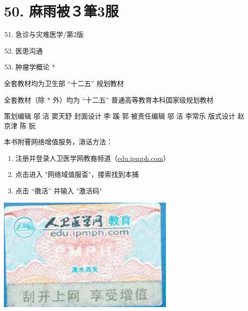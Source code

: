 \documentclass[10pt]{article}
\begin{document}
\section*{50. 麻雨被３筆3服}
\begin{enumerate}
  \setcounter{enumi}{50}
  \item 急诊与灾难医学/第2版

  \item 医患沟通

  \item 肿瘤学概论 *

\end{enumerate}

全套教材均为卫生部 “十二五” 规划教材

全套教材（除 * 外）均为 “十二五” 普通高等教育本科国家级规划教材

策划编辑 邬 洁 窦天舒 封面设计 李 蹊 郭 被责任编辑 邬 洁 李常乐 版式设计 赵京津 陈 朊

本书附罾网络增值服务，潡话方法：

\begin{enumerate}
  \item 注册并登录人卫医学网教裔频道（\href{http://edu.ipmph.com}{edu.ipmph.com}）

  \item 点击进入 "网络域值服㫘"，搂索找到本捕

  \item 点击 “擞活” 并输入 "激活码"

\end{enumerate}

\begin{center}
\includegraphics[max width=\textwidth]{2024_07_09_002a177993bd97d1d6d7g-273}
\end{center}
\end{document}
